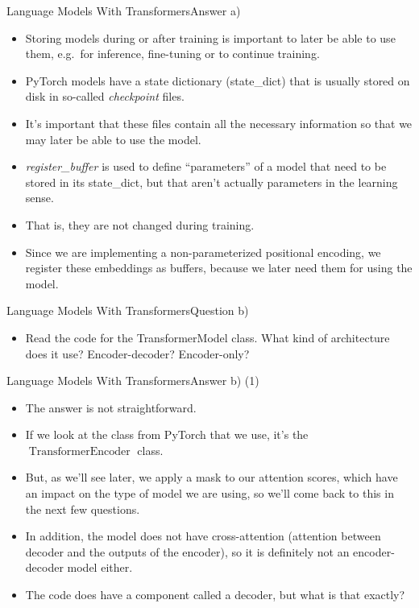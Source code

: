 \documentclass[t]{beamer}
\newcommand\op[1]{\operatorname{#1}}
\begin{document}
\begin{frame}{Language Models With Transformers}{Answer a)}
    \begin{itemize}
        \item Storing models during or after training is important to later be
              able to use them, e.g.\ for inference, fine-tuning or to continue
              training.
        \item PyTorch models have a state dictionary (state\_dict) that is
              usually stored on disk in so-called \emph{checkpoint} files.
        \item It's important that these files contain all the necessary
              information so that we may later be able to use the model.
        \item \emph{register\_buffer} is used to define ``parameters'' of a
              model that need to be stored in its state\_dict, but that aren't
              actually parameters in the learning sense.
        \item That is, they are not changed during training.
        \item Since we are implementing a non-parameterized positional encoding,
              we register these embeddings as buffers, because we later need
              them for using the model.
    \end{itemize}
\end{frame}

\begin{frame}{Language Models With Transformers}{Question b)}
    \begin{itemize}
        \item Read the code for the TransformerModel class. What kind of
              architecture does it use? Encoder-decoder? Encoder-only?
    \end{itemize}
\end{frame}

\begin{frame}{Language Models With Transformers}{Answer b) (1)}
    \begin{itemize}
        \item The answer is not straightforward.
        \item If we look at the class from PyTorch that we use, it's the
              $\op{TransformerEncoder}$ class.
        \item But, as we'll see later, we apply a mask to our attention scores,
              which have an impact on the type of model we are using, so we'll
              come back to this in the next few questions.
        \item In addition, the model does not have cross-attention (attention
              between decoder and the outputs of the encoder), so it is
              definitely not an encoder-decoder model either.
        \item The code does have a component called a decoder, but what is that
              exactly?
    \end{itemize}
\end{frame}
\end{document}

